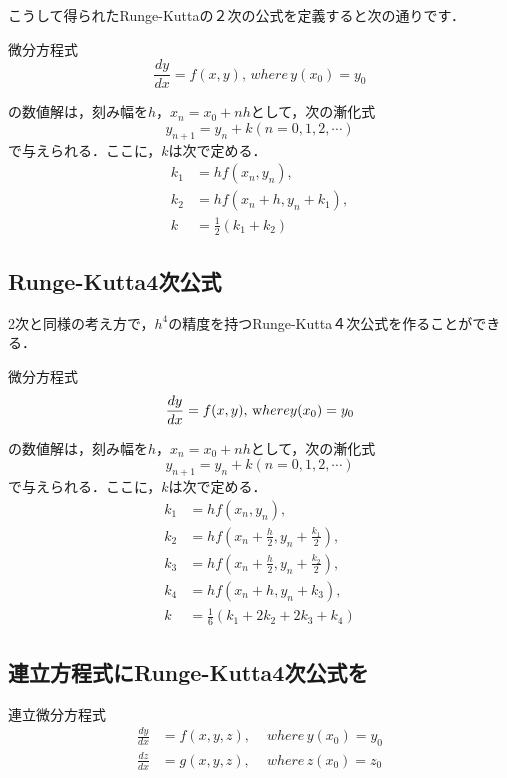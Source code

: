 \documentclass[11pt,dvipdfmx]{jsarticle}
\begin{document}
こうして得られたRunge-Kuttaの２次の公式を定義すると次の通りです．

微分方程式 \[
\frac{dy}{dx} = f(x,y), \, where \, y(x_0)=y_0
\]

の数値解は，刻み幅を\(h\)，\(x_n=x_0+nh\)として，次の漸化式 \[
y_{n+1} = y_n +k (n=0,1,2,\cdots)
\] で与えられる．ここに，\(k\)は次で定める． \[
\begin{aligned}
k_1 & = hf(x_n,y_n), \\
k_2 & = hf(x_n+h, y_n+k_1), \\
k & = \frac{1}{2}(k_1+k_2)
\end{aligned}
\]

    \subsection{Runge-Kutta4次公式}\label{runge-kutta4ux6b21ux516cux5f0f}

2次と同様の考え方で，\(h^4\)の精度を持つRunge-Kutta４次公式を作ることができる．

微分方程式 \[
\frac{dy}{dx} = f(x,y), \, {\textrm where}y(x_0)=y_0
\]

の数値解は，刻み幅を\(h\)，\(x_n=x_0+nh\)として，次の漸化式 \[
y_{n+1} = y_n +k (n=0,1,2,\cdots)
\] で与えられる．ここに，\(k\)は次で定める． \[
\begin{aligned}
k_1 & = hf(x_n,y_n), \\
k_2 & = hf(x_n+\frac{h}{2}, y_n+\frac{k_1}{2}), \\
k_3 & = hf(x_n+\frac{h}{2}, y_n+\frac{k_2}{2}), \\
k_4 & = hf(x_n+h, y_n+k_3), \\
k & = \frac{1}{6}(k_1+2k_2+2k_3+k_4)
\end{aligned}
\]

    \subsection{連立方程式にRunge-Kutta4次公式を}\label{ux9023ux7acbux65b9ux7a0bux5f0fux306brunge-kutta4ux6b21ux516cux5f0fux3092}

連立微分方程式 \[
\begin{aligned}
\frac{dy}{dx} &= f(x,y,z), &\, \, where \, y(x_0)=y_0 \\
\frac{dz}{dx} &= g(x,y,z), &\, \, where \, z(x_0)=z_0 \\
\end{aligned}
\]
\end{document}
